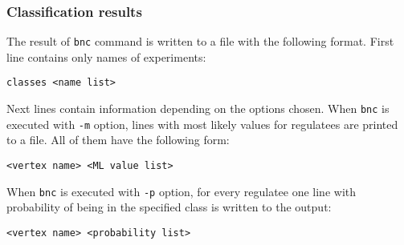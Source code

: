 \subsubsection{Classification results}

The result of \texttt{bnc} command is written to a file with the following format. First line contains only names of experiments:
\begin{verbatim}
classes <name list>
\end{verbatim}
Next lines contain information depending on the options chosen. When \texttt{bnc} is executed with \texttt{-m} option, lines with most likely values for regulatees are printed to a file. All of them have the following form:
\begin{verbatim}
<vertex name> <ML value list>
\end{verbatim}
When \texttt{bnc} is executed with \texttt{-p} option, for every regulatee one line with probability of being in the specified class is written to the output:
\begin{verbatim}
<vertex name> <probability list>
\end{verbatim}
